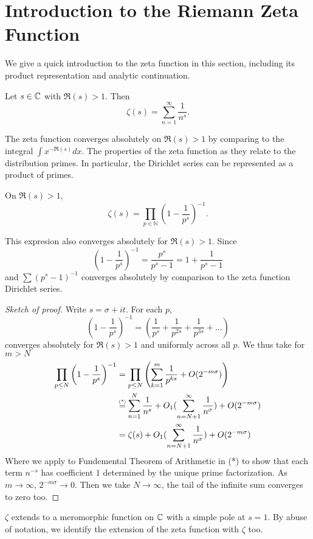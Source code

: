 \section{Introduction to the Riemann Zeta Function}
We give a quick introduction to the zeta function in this section, including its product representation and analytic continuation.
\begin{definition}
	Let $s\in\mathbb{C}$ with $\Re(s)>1$. Then \begin{equation}
	\zeta(s)=\sum_{n=1}^{\infty}\frac{1}{n^s}.
	\end{equation}
\end{definition}
The zeta function converges absolutely on $\Re(s)>1$ by comparing to the integral $\int x^{-\Re(s)} dx$.
The properties of the zeta function as they relate to the distribution primes. In particular, the Dirichlet series can be represented as a product of primes.
\begin{proposition}\label{eulerproduct}
	On $\Re(s)>1$, \begin{equation}
		\zeta(s) = \prod_{p\in\mathbb{N}}\left(1-\frac{1}{p^s}\right)^{-1}.	
	\end{equation}
\end{proposition}
\begin{remark}
	This expresion also converges absolutely for $\Re(s)>1$. Since \[
		\left(1-\frac{1}{p^s}\right)^{-1} = \frac{p^s}{p^s-1} = 1 + \frac{1}{p^s-1}
	\]
	and $\sum(p^s-1)^{-1}$ converges absolutely by comparison to the zeta function Dirichlet series.
\end{remark}
\begin{proof}[Sketch of proof]
	Write $s=\sigma+it$. For each $p$,\[
		\left(1-\frac{1}{p^s}\right)^{-1} = \left(\frac{1}{p^s}+\frac{1}{p^{2s}}+\frac{1}{p^{3s}}+...\right)
	\]
	converges absolutely for $\Re(s)>1$ and uniformly across all $p$. We thus take for $m>N$ \begin{align*}
		\prod_{p\leq N}\left(1-\frac{1}{p^s}\right)^{-1}  &= \prod_{p\leq N}\left(\sum_{k=1}^{m} \frac{1}{p^{ks}}+O(2^{-m\sigma})\right)\\
		&\stackeq{(*)}\sum_{n=1}^{N}\frac{1}{n^s}+O_1(\sum_{n=N+1}^{\infty} \frac{1}{n^\sigma}) + O(2^{-m\sigma})\\
		&=\zeta(s) + O_1(\sum_{n=N+1}^{\infty} \frac{1}{n^\sigma}) + O(2^{-m\sigma})
	\end{align*}
	Where we apply to Fundemental Theorem of Arithmetic in (*) to show that each term $n^{-s}$ has coefficient $1$ determined by the unique prime factorization.
	As $m\to\infty$, $2^{-m\sigma} \to 0$. Then we take $N\to\infty$, the tail of the infinite sum converges to zero too.
\end{proof}
\begin{proposition} \label{analyticcontinuation}
	$\zeta$ extends to a meromorphic function on $\mathbb{C}$ with a simple pole at $s=1$. By abuse of notation, we identify the extension of the zeta function with $\zeta$ too.
\end{proposition}

